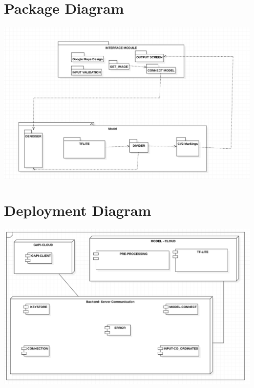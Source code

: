\section{Package Diagram}
\includegraphics[scale=0.4]{images/package.png}
\section{Deployment Diagram}
\includegraphics[scale=0.4]{images/deploy.png}
